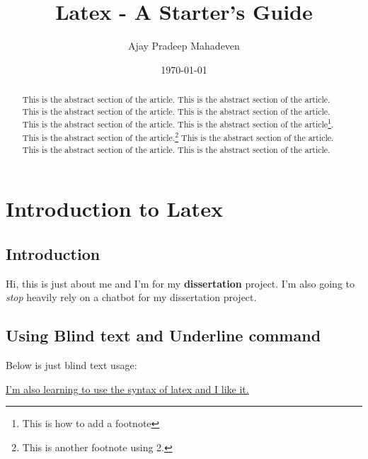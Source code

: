 \documentclass{report}
\title{\textbf{Latex - A Starter's Guide} }
\author{Ajay Pradeep Mahadeven }
\date{\today}
\theoremstyle{plain} %
\begin{document}
\linenumbers

\maketitle

\newpage
\tableofcontents 
\listoffigures
\listoftables
\chapter{Introduction to Latex}

\newpage

\begin{abstract} %
    This is the abstract section of the article. This is the abstract section of the article. This is the abstract section of the article. This is the abstract section of the article. This is the abstract section of the article. This is the abstract section of the article\footnote[1]{This is how to add a footnote }. This is the abstract section of the article.\footnote[2]{This is another footnote using 2.} This is the abstract section of the article. This is the abstract section of the article. This is the abstract section of the article.
\end{abstract}

\section{Introduction} \label{introduction}
Hi, this is just about me and I'm  for my \textbf{dissertation} project. I'm also going to \textit{stop} heavily rely on a chatbot for my dissertation project. 


\section{Using Blind text and Underline command}
Below is just blind text usage: \par
\textbf{\blindtext}

\underline{I'm also learning to use the syntax of latex and I like it.}

\end{document}
